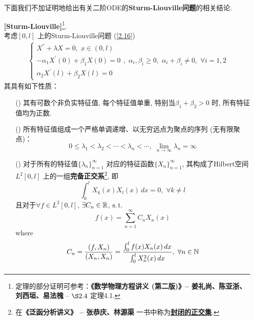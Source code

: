 	\vspace*{6em}
	
	下面我们不加证明地给出有关二阶ODE的\textbf{Sturm-Liouville问题}的相关结论. 
	
	\newpage
	
	\begin{thm}\label{thm 2.3.4}
		\textbf{[Sturm-Liouville]}\footnote{定理的部分证明可参考：\textbf{《数学物理方程讲义 (第二版)》--  姜礼尚、陈亚浙、刘西垣、易法槐} -- $\S 2.4$ 定理4.1. }. \\
		考虑$[0 , l]$ 上的Sturm-Liouville问题 (\ref{2.16})
		\begin{align*}
			\begin{cases}
				X^{''} + \lambda X = 0 , \,\, x \in (0 , l) \\
				-\alpha_1 X^{'}(0) + \beta_1 X(0) = 0 \\
				\alpha_2 X^{'}(l) + \beta_2 X(l) = 0
			\end{cases} , \,\, 
			\alpha_i , \beta_i \geq 0 , \,\, \alpha_i + \beta_i \neq 0 , \,\, \forall i = 1 , 2 
		\end{align*}
		其具有如下性质：
		
		\vspace*{1em}
		
		\begin{enumerate}
			\item [(\rmnum{1})] 其有可数个非负实特征值, 每个特征值单重, 特别当$\beta_1 + \beta_2 > 0$ 时, 所有特征值均为正数. 
			
			\vspace*{3em}
			
			\item[(\rmnum{2})] 所有特征值组成一个严格单调递增、以无穷远点为聚点的序列 (无有限聚点)：
			\[ 0 \leq \lambda_1 < \lambda_2 < \cdots < \lambda_n < \cdots , \,\, \lim_{n \to \infty}\lambda_n = \infty \]
			
			\vspace*{3em}
			
			\item[(\rmnum{3})] 对于所有的特征值$\{ \lambda_n \}_{n = 1}^{\infty}$ 对应的特征函数$\{ X_{n} \}_{n = 1}^{\infty}$, 其构成了Hilbert空间$L^{2}[0 , l]$ 上的一组\textbf{完备正交系}\footnote{在\textbf{《泛函分析讲义》 -- 张恭庆、林源渠} 一书中称为\underline{\textbf{封闭的正交集}}. }, 即
			\[ \int_{0}^l X_{k}(x) X_{l}(x) \, dx = 0 , \,\, \forall k \neq l \]
			且对于$\forall f \in L^2[0 , l]$, $\exists C_n \in \mathbb{R}$, $\operatorname{s.t.}$
			\[ f(x) = \sum_{n = 1}^{\infty} C_n X_n(x) \]
			where
			\[ C_n = \frac{(f , X_n)}{(X_n , X_n)} = \frac{\int_{0}^l f(x) X_n(x) \, dx}{\int_{0}^l X_{n}^2(x) \, dx} , \,\, \forall n \in \mathbb{N} \]
			\[  \]
		\end{enumerate}
	\end{thm}

